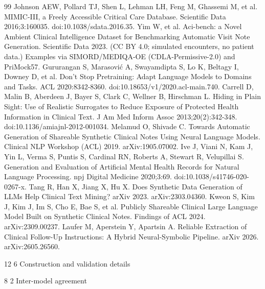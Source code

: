 \documentclass[3p,twocolumn]{elsarticle}
\makeatletter
\renewcommand\section{\@startsection {section}{1}{\z@}%
    {12\p@ \@plus 4\p@ \@minus 4\p@}%
    {6\p@ \@plus 4\p@ \@minus 3\p@}%
    {\normalsize\bfseries\boldmath}}
\renewcommand\subsection{\@startsection{subsection}{2}{\z@}%
    {8\p@ \@plus 4\p@ \@minus 4\p@}%
    {2\p@ \@plus 4\p@ \@minus 3\p@}%
    {\normalfont\normalsize\itshape}}
\makeatother
\begin{document}
\begin{thebibliography}{99}
\label{r39} Johnson AEW, Pollard TJ, Shen L, Lehman LH, Feng M, Ghassemi M, et al. MIMIC-III, a Freely Accessible Critical Care Database. Scientific Data 2016;3:160035. doi:10.1038/sdata.2016.35.
\label{r40} Yim W, et al. Aci-bench: a Novel Ambient Clinical Intelligence Dataset for Benchmarking Automatic Visit Note Generation. Scientific Data 2023. (CC BY 4.0; simulated encounters, no patient data.) Examples via SIMORD/MEDIQA-OE (CDLA-Permissive-2.0) and PriMock57.
\label{r41} Gururangan S, Marasović A, Swayamdipta S, Lo K, Beltagy I, Downey D, et al. Don't Stop Pretraining: Adapt Language Models to Domains and Tasks. ACL 2020:8342-8360. doi:10.18653/v1/2020.acl-main.740.
\label{r42} Carrell D, Malin B, Aberdeen J, Bayer S, Clark C, Wellner B, Hirschman L. Hiding in Plain Sight: Use of Realistic Surrogates to Reduce Exposure of Protected Health Information in Clinical Text. J Am Med Inform Assoc 2013;20(2):342-348. doi:10.1136/amiajnl-2012-001034.
\label{r43} Melamud O, Shivade C. Towards Automatic Generation of Shareable Synthetic Clinical Notes Using Neural Language Models. Clinical NLP Workshop (ACL) 2019. arXiv:1905.07002.
\label{r44} Ive J, Viani N, Kam J, Yin L, Verma S, Puntis S, Cardinal RN, Roberts A, Stewart R, Velupillai S. Generation and Evaluation of Artificial Mental Health Records for Natural Language Processing. npj Digital Medicine 2020;3:69. doi:10.1038/s41746-020-0267-x.
\label{r45} Tang R, Han X, Jiang X, Hu X. Does Synthetic Data Generation of LLMs Help Clinical Text Mining? arXiv 2023. arXiv:2303.04360.
\label{r46} Kweon S, Kim J, Kim J, Im S, Cho E, Bae S, et al. Publicly Shareable Clinical Large Language Model Built on Synthetic Clinical Notes. Findings of ACL 2024. arXiv:2309.00237.
\label{r47} Laufer M, Aperstein Y, Apartsin A. Reliable Extraction of Clinical Follow-Up Instructions: A Hybrid Neural-Symbolic Pipeline. arXiv 2026. arXiv:2605.26560.
\end{thebibliography}


\appendix

\section{Construction and validation details}\label{appendix-construction-and-validation-details}

\subsection{Inter-model agreement}\label{a.1-inter-model-agreement}
\end{document}
